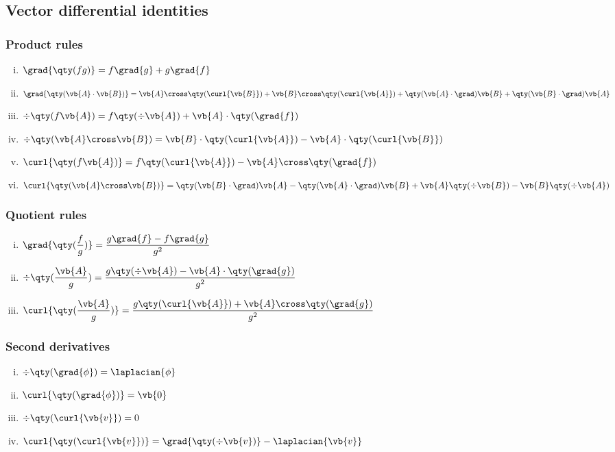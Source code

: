 	\subsection{Vector differential identities}
		\subsubsection{Product rules}
			\begin{enumerate}[(i)]
				\item $\grad{\qty(fg)}=f\grad{g}+g\grad{f}$
				\item $\grad{\qty(\vb{A}\cdot\vb{B})}=\vb{A}\cross\qty(\curl{\vb{B}})+\vb{B}\cross\qty(\curl{\vb{A}})+\qty(\vb{A}\cdot\grad)\vb{B}+\qty(\vb{B}\cdot\grad)\vb{A}$
				\item $\div{\qty(f\vb{A})}=f\qty(\div{\vb{A}})+\vb{A}\cdot\qty(\grad{f})$
				\item $\div{\qty(\vb{A}\cross\vb{B})}=\vb{B}\cdot\qty(\curl{\vb{A}})-\vb{A}\cdot\qty(\curl{\vb{B}})$
				\item $\curl{\qty(f\vb{A})}=f\qty(\curl{\vb{A}})-\vb{A}\cross\qty(\grad{f})$
				\item $\curl{\qty(\vb{A}\cross\vb{B})}=\qty(\vb{B}\cdot\grad)\vb{A}-\qty(\vb{A}\cdot\grad)\vb{B}+\vb{A}\qty(\div{\vb{B}})-\vb{B}\qty(\div{\vb{A}})$
			\end{enumerate}
			
		\subsubsection{Quotient rules}
			\begin{enumerate}[(i)]
				\item $\displaystyle\grad{\qty(\dfrac{f}{g})}=\dfrac{g\grad{f}-f\grad{g}}{g^2}$
				\item $\displaystyle\div{\qty(\dfrac{\vb{A}}{g})}=\dfrac{g\qty(\div{\vb{A}})-\vb{A}\cdot\qty(\grad{g})}{g^2}$
				\item $\displaystyle\curl{\qty(\dfrac{\vb{A}}{g})}=\dfrac{g\qty(\curl{\vb{A}})+\vb{A}\cross\qty(\grad{g})}{g^2}$
			\end{enumerate}
			
		\subsubsection{Second derivatives}
			\begin{enumerate}[(i)]
				\item $\div{\qty(\grad{\phi})}=\laplacian{\phi}$
				\item $\curl{\qty(\grad{\phi})}=\vb{0}$
				\item $\div{\qty(\curl{\vb{v}})}=0$
				\item $\curl{\qty(\curl{\vb{v}})}=\grad{\qty(\div{\vb{v}})}-\laplacian{\vb{v}}$
			\end{enumerate}
	
